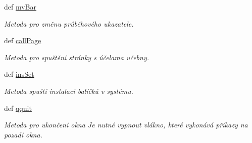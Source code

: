 \begin{DoxyCompactItemize}
def \hyperlink{classmnFocus_1_1App_abeafb220b3de369f9c53303aee0021b5}{mv\-Bar}
\begin{DoxyCompactList}\small\item\em Metoda pro změnu průběhového ukazatele. \end{DoxyCompactList}\item 
def \hyperlink{classmnFocus_1_1App_aee9420a407130cec034afb6d5c32278c}{call\-Page}
\begin{DoxyCompactList}\small\item\em Metoda pro spuštění stránky s účelama učebny. \end{DoxyCompactList}\item 
def \hyperlink{classmnFocus_1_1App_a2ad6e7b25e3ebd9dbf284a5046ed22d0}{ins\-Set}
\begin{DoxyCompactList}\small\item\em Metoda spuští instalaci balíčků v systému. \end{DoxyCompactList}\item 
def \hyperlink{classmnFocus_1_1App_af8116e51713d83edb9b3d91cf4449329}{qquit}
\begin{DoxyCompactList}\small\item\em Metoda pro ukončení okna Je nutné vypnout vlákno, které vykonává příkazy na pozadí okna. \end{DoxyCompactList}\end{DoxyCompactItemize}
